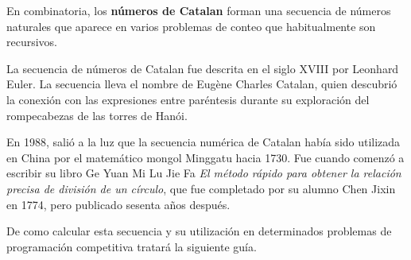 En combinatoria, los \textbf{números de Catalan} forman una secuencia de números naturales que aparece en varios problemas de conteo que habitualmente son recursivos. 

La secuencia de números de Catalan fue descrita en el siglo XVIII por Leonhard Euler. La secuencia lleva el nombre de Eugène Charles Catalan, quien descubrió la conexión con las expresiones entre paréntesis durante su exploración del rompecabezas de las torres de Hanói.

En 1988, salió a la luz que la secuencia numérica de Catalan había sido utilizada en China por el matemático mongol Minggatu hacia 1730. Fue cuando comenzó a escribir su libro Ge Yuan Mi Lu Jie Fa \emph{El método rápido para obtener la relación precisa de división de un círculo}, que fue completado por su alumno Chen Jixin en 1774, pero publicado sesenta años después. 

De como calcular esta secuencia y su utilización en determinados problemas de programación competitiva tratará la siguiente guía.